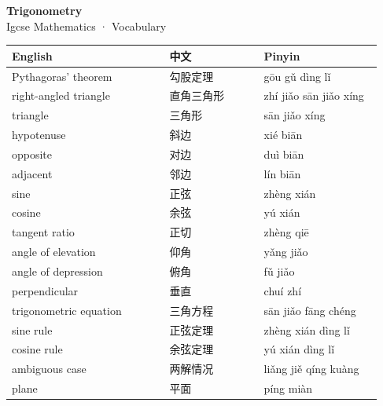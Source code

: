 \documentclass[11pt]{article}
\begin{document}
\begin{center}
  {\LARGE\bfseries Trigonometry}\\[0.35em]
  {\large Igcse Mathematics · Vocabulary}
\end{center}
\vspace{0.6em}

\begin{longtable}{@{}p{0.40\linewidth}p{0.24\linewidth}p{0.30\linewidth}@{}}
\toprule
\textbf{English} & \textbf{中文} & \textbf{Pinyin} \\
\midrule
\endhead
\bottomrule
\endlastfoot
Pythagoras' theorem & 勾股定理 & gōu gǔ dìng lǐ \\
right-angled triangle & 直角三角形 & zhí jiǎo sān jiǎo xíng \\
triangle & 三角形 & sān jiǎo xíng \\
hypotenuse & 斜边 & xié biān \\
opposite & 对边 & duì biān \\
adjacent & 邻边 & lín biān \\
sine & 正弦 & zhèng xián \\
cosine & 余弦 & yú xián \\
tangent ratio & 正切 & zhèng qiē \\
angle of elevation & 仰角 & yǎng jiǎo \\
angle of depression & 俯角 & fǔ jiǎo \\
perpendicular & 垂直 & chuí zhí \\
trigonometric equation & 三角方程 & sān jiǎo fāng chéng \\
sine rule & 正弦定理 & zhèng xián dìng lǐ \\
cosine rule & 余弦定理 & yú xián dìng lǐ \\
ambiguous case & 两解情况 & liǎng jiě qíng kuàng \\
plane & 平面 & píng miàn \\
\end{longtable}
\end{document}
